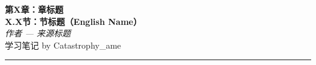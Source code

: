 \documentclass[11pt, a4paper]{ctexart}
\begin{document}
\begin{center}
  {\LARGE \textbf{第X章：章标题}} \\[4pt]
  {\LARGE \textbf{X.X节：节标题（English Name）}} \\[6pt]
  {\large \textit{作者 --- 来源标题}} \\[2pt]
  {\small 学习笔记  by Catastrophy\_ame}
\end{center}


\vspace{0.5em}
\hrule
\vspace{1em}

\end{document}
